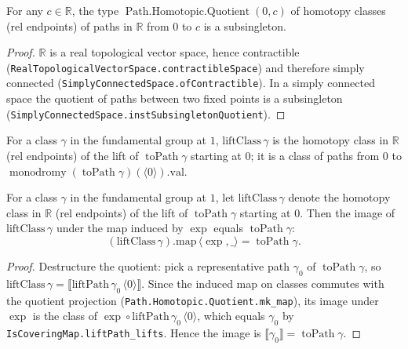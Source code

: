 \begin{lemma}
    \label{lem:quotient-subsingleton}
    \leanok
    For any \(c \in \mathbb{R}\), the type \(\operatorname{Path.Homotopic.Quotient}(0, c)\) of
    homotopy classes (rel endpoints) of paths in \(\mathbb{R}\) from \(0\) to \(c\) is a
    subsingleton.
\end{lemma}
\begin{proof}
    \(\mathbb{R}\) is a real topological vector space, hence contractible
    (\texttt{RealTopologicalVectorSpace.contractibleSpace}) and therefore simply connected
    (\texttt{SimplyConnectedSpace.ofContractible}). In a simply connected space the quotient of
    paths between two fixed points is a subsingleton
    (\texttt{SimplyConnectedSpace.instSubsingletonQuotient}).
\end{proof}

\begin{definition}
    \label{def:lift-class}
    \leanok
    For a class \(\gamma\) in the fundamental group at \(1\), \(\mathrm{liftClass}\,\gamma\) is the
    homotopy class in \(\mathbb{R}\) (rel endpoints) of the lift of \(\operatorname{toPath}\gamma\)
    starting at \(0\); it is a class of paths from \(0\) to
    \(\operatorname{monodromy}(\operatorname{toPath}\gamma)(\langle 0\rangle).\mathrm{val}\).
\end{definition}

\begin{lemma}
    \label{lem:loop-eq-exp-of-lift-class}
    \leanok
    For a class \(\gamma\) in the fundamental group at \(1\), let \(\mathrm{liftClass}\,\gamma\) denote
    the homotopy class in \(\mathbb{R}\) (rel endpoints) of the lift of \(\operatorname{toPath}\gamma\)
    starting at \(0\). Then the image of \(\mathrm{liftClass}\,\gamma\) under the map induced by \(\exp\)
    equals \(\operatorname{toPath}\gamma\):
    \[
      (\mathrm{liftClass}\,\gamma).\mathrm{map}\,\langle\exp,\_\rangle = \operatorname{toPath}\gamma .
    \]
\end{lemma}
\begin{proof}
    Destructure the quotient: pick a representative path \(\gamma_0\) of \(\operatorname{toPath}\gamma\),
    so \(\mathrm{liftClass}\,\gamma = \llbracket\mathrm{liftPath}\,\gamma_0\,\langle 0\rangle\rrbracket\).
    Since the induced map on classes commutes with the quotient projection
    (\texttt{Path.Homotopic.Quotient.mk\_map}), its image under \(\exp\) is the class of
    \(\exp\circ\mathrm{liftPath}\,\gamma_0\,\langle 0\rangle\), which equals \(\gamma_0\) by
    \texttt{IsCoveringMap.liftPath\_lifts}. Hence the image is
    \(\llbracket\gamma_0\rrbracket = \operatorname{toPath}\gamma\).
\end{proof}

